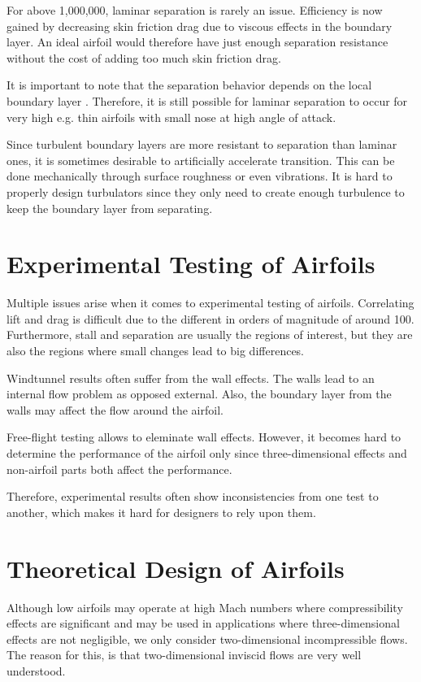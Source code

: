 \documentclass[letterpaper,12pt,]{article}
\begin{document}
For \rn above 1,000,000, laminar separation is rarely an issue. Efficiency is now gained by decreasing skin friction drag due to viscous effects in the boundary layer. An ideal airfoil would therefore have just enough separation resistance without the cost of adding too much skin friction drag.

It is important to note that the separation behavior depends on the local boundary layer \rn. Therefore, it is still possible for laminar separation to occur for very high \rn e.g. thin airfoils with small nose at high angle of attack.

Since turbulent boundary layers are more resistant to separation than laminar ones, it is sometimes desirable to artificially accelerate transition. This can be done mechanically through surface roughness or even vibrations. It is hard to properly design turbulators since they only need to create enough turbulence to keep the boundary layer from separating.

\section{Experimental Testing of Airfoils}

Multiple issues arise when it comes to experimental testing of airfoils. Correlating lift and drag is difficult due to the different in orders of magnitude of around 100. Furthermore, stall and separation are usually the regions of interest, but they are also the regions where small changes lead to big differences.

Windtunnel results often suffer from the wall effects. The walls lead to an internal flow problem as opposed external. Also, the boundary layer from the walls may affect the flow around the airfoil.

Free-flight testing allows to eleminate wall effects. However, it becomes hard to determine the performance of the airfoil only since three-dimensional effects and non-airfoil parts both affect the performance.

Therefore, experimental results often show inconsistencies from one test to another, which makes it hard for designers to rely upon them.

\section{Theoretical Design of Airfoils}

Although low \rn airfoils may operate at high Mach numbers where compressibility effects are significant and may be used in applications where three-dimensional effects are not negligible, we only consider two-dimensional incompressible flows. The reason for this, is that two-dimensional inviscid flows are very well understood.
\end{document}
